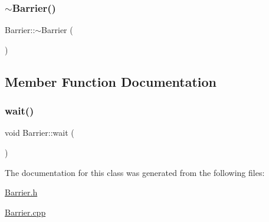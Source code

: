 \mbox{\label{class_barrier_a401f40e73302009b305904ffc7825304}} 
\subsubsection{\texorpdfstring{$\sim$\+Barrier()}{~Barrier()}}
{\footnotesize\ttfamily Barrier\+::$\sim$\+Barrier (\begin{DoxyParamCaption}{ }\end{DoxyParamCaption})\hspace{0.3cm}{\ttfamily [virtual]}}



\subsection{Member Function Documentation}
\mbox{\label{class_barrier_a83a9d2e85e98b3d2081538bf0da29b60}} 
\subsubsection{\texorpdfstring{wait()}{wait()}}
{\footnotesize\ttfamily void Barrier\+::wait (\begin{DoxyParamCaption}{ }\end{DoxyParamCaption})}



The documentation for this class was generated from the following files\+:\begin{DoxyCompactItemize}
\item 
\hyperlink{_barrier_8h}{Barrier.\+h}\item 
\hyperlink{_barrier_8cpp}{Barrier.\+cpp}\end{DoxyCompactItemize}
